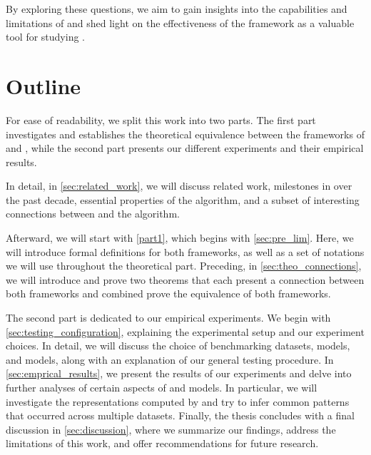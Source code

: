 By exploring these questions, we aim to gain insights into the capabilities and limitations of \gnns and shed light on the effectiveness of the \wlnn framework as a valuable tool for studying \gnns.

\section{Outline}
For ease of readability, we split this work into two parts. The first part investigates and establishes the theoretical equivalence between the frameworks of \wlnn and \gnns, while the second part presents our different experiments and their empirical results.

In detail, in \cref{sec:related_work}, we will discuss related work, milestones in \gnns over the past decade, essential properties of the \wl algorithm, and a subset of interesting connections between \gnns and the \wl algorithm.

Afterward, we will start with \cref{part1}, which begins with \cref{sec:pre_lim}. Here, we will introduce formal definitions for both frameworks, as well as a set of notations we will use throughout the theoretical part. Preceding, in \cref{sec:theo_connections}, we will introduce and prove two theorems that each present a connection between both frameworks and combined prove the equivalence of both frameworks.

The second part is dedicated to our empirical experiments. We begin with \cref{sec:testing_configuration}, explaining the experimental setup and our experiment choices. In detail, we will discuss the choice of benchmarking datasets, \gnn models, and \wlnn models, along with an explanation of our general testing procedure. In \cref{sec:emprical_results}, we present the results of our experiments and delve into further analyses of certain aspects of \gnn and \wlnn models. In particular, we will investigate the representations computed by \gnns and try to infer common patterns that occurred across multiple datasets. Finally, the thesis concludes with a final discussion in \cref{sec:discussion}, where we summarize our findings, address the limitations of this work, and offer recommendations for future research.